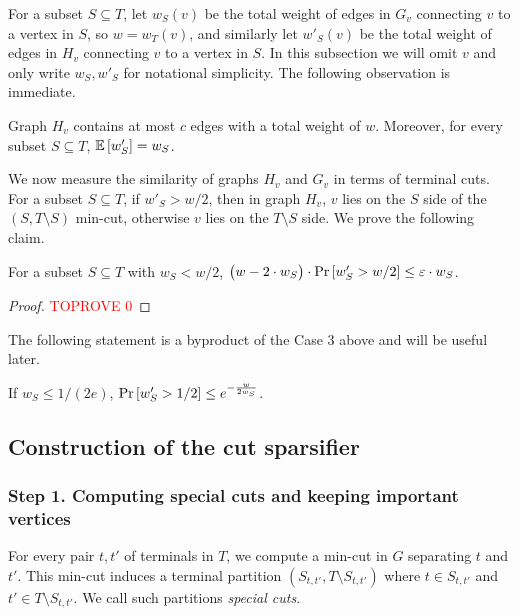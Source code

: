 For a subset $S\subseteq T$, let $w_S(v)$ be the total weight of edges in $G_v$ connecting $v$ to a vertex in $S$, so $w=w_T(v)$, and similarly let $w'_S(v)$ be the total weight of edges in $H_v$ connecting $v$ to a vertex in $S$. 
In this subsection we will omit $v$ and only write $w_S,w'_S$ for notational simplicity.
The following observation is immediate.

\begin{observation}
\label{obs: property}
Graph $H_v$ contains at most $c$ edges with a total weight of $w$. Moreover, for every subset $S\subseteq T$, ${\mathbb{E}}\left[ w'_S \right]=w_S$.
\end{observation}

We now measure the similarity of graphs $H_v$ and $G_v$ in terms of terminal cuts.
For a subset $S\subseteq T$, if $w'_S>w/2$, then in graph $H_v$, $v$ lies on the $S$ side of the $(S, T\setminus S)$ min-cut, otherwise $v$ lies on the $T\setminus S$ side. 
%
We prove the following claim.

\begin{claim}
\label{clm: difference in contribution}
For a subset $S\subseteq T$ with $w_S<w/2$, $\big(w-2\cdot w_S\big) \cdot \mathrm{Pr}\left[ w'_S>w/2 \right] \le {\varepsilon} \cdot w_S$.
\end{claim}
\begin{proof}\textcolor{red}{TOPROVE 0}\end{proof}

The following statement is a byproduct of the Case 3 above and will be useful later.
%
\begin{claim} \label{prop:v2}
	If $w_S \le 1/(2e)$, $\mathrm{Pr}\left[ w'_S > 1/2 \right] \le e^{-\frac{w}{2w_S}}$.
\end{claim}

\subsection{Construction of the cut sparsifier}

\subsubsection*{Step 1. Computing special cuts and keeping important vertices}

For every pair $t,t'$ of terminals in $T$, we compute a min-cut in $G$ separating $t$ and $t'$. This min-cut induces a terminal partition $(S_{t,t'},T\setminus S_{t,t'})$ where $t\in S_{t,t'}$ and $t'\in T\setminus S_{t,t'}$. We call such partitions \emph{special cuts}.

